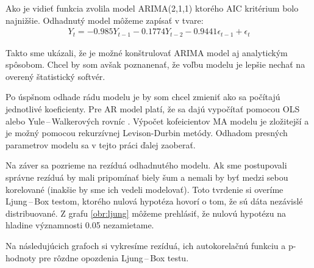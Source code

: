\documentclass[12pt,a4paper,oneside,final]{article}
\theoremstyle{definition}
\theoremstyle{remark}
\numberwithin{equation}{section}
\begin{document}
Ako je vidieť funkcia zvolila model ARIMA(2,1,1) ktorého AIC kritérium bolo najnižšie.
Odhadnutý model môžeme zapísať v tvare:
\begin{eqnarray} \label{rov:arima_model}
    Y_t = -0.985 Y_{t-1} - 0.1774 Y_{t-2} -0.9441\epsilon_{t-1} + \epsilon_{t}
\end{eqnarray}

Takto sme ukázali, že je možné konštrulovať ARIMA model aj analytickým spôsobom. 
Chcel by som avšak poznanenať, že voľbu modelu je lepšie nechať na overený štatistický
softvér. 

Po úspšnom odhade rádu modelu je by som chcel zmieniť ako sa počítajú jednotlivé
koeficienty. Pre AR model platí, že sa dajú vypočítať pomocou OLS alebo Yule\,--\,Walkerových
rovníc \cite{brockwell_ts}. Výpočet kofeicientov MA modelu je zložitejší a je možný pomocou rekurzívnej Levison-Durbin 
metódy. Odhadom presných parametrov modelu sa v tejto práci ďalej zaoberať.  

Na záver sa pozrieme na rezíduá odhadnutého modelu. Ak sme postupovali správne rezíduá by
mali pripomínať biely šum a nemali by byť medzi sebou korelované (inakšie by sme ich
vedeli modelovať). Toto tvrdenie si overíme Ljung\,--\,Box testom, ktorého nulová hypotéza
hovorí o tom, že sú dáta nezávislé distribuované. Z grafu \ref{obr:ljung} môžeme
prehlásiť, že nulovú hypotézu na hladine významnosti 0.05 nezamietame.

Na následujúcich grafoch si vykresíme rezíduá, ich autokorelačnú funkciu a p-hodnoty
pre rôzdne opozdenia Ljung\,--\,Box testu.
\end{document}
